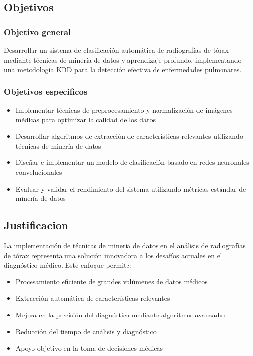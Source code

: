 \documentclass[conference]{IEEEtran}
\begin{document}
\subsection{Objetivos}
\subsubsection{Objetivo general}
Desarrollar un sistema de clasificación automática de radiografías de tórax mediante técnicas de minería de datos y aprendizaje profundo, implementando una metodología KDD para la detección efectiva de enfermedades pulmonares.

\subsubsection{Objetivos especificos}
\begin{itemize}
    \item Implementar técnicas de preprocesamiento y normalización de imágenes médicas para optimizar la calidad de los datos
    \item Desarrollar algoritmos de extracción de características relevantes utilizando técnicas de minería de datos
    \item Diseñar e implementar un modelo de clasificación basado en redes neuronales convolucionales
    \item Evaluar y validar el rendimiento del sistema utilizando métricas estándar de minería de datos
\end{itemize}

\subsection{Justificacion}
La implementación de técnicas de minería de datos en el análisis de radiografías de tórax representa una solución innovadora a los desafíos actuales en el diagnóstico médico. Este enfoque permite:
\begin{itemize}
    \item Procesamiento eficiente de grandes volúmenes de datos médicos
    \item Extracción automática de características relevantes
    \item Mejora en la precisión del diagnóstico mediante algoritmos avanzados
    \item Reducción del tiempo de análisis y diagnóstico
    \item Apoyo objetivo en la toma de decisiones médicas
\end{itemize}
\end{document}

